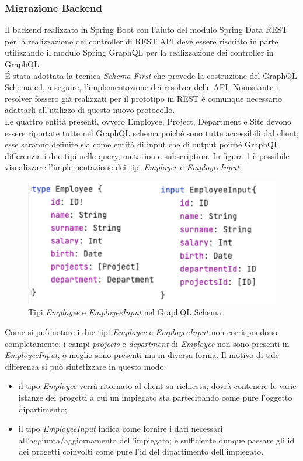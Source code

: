 \subsubsection*{Migrazione Backend}
Il backend realizzato in Spring Boot con l'aiuto del modulo Spring Data REST per la realizzazione dei controller di REST API deve essere riscritto in parte utilizzando il modulo Spring GraphQL per la realizzazione dei controller in GraphQL.\\
É stata adottata la tecnica \textit{Schema First} che prevede la costruzione del GraphQL Schema ed, a seguire, l'implementazione dei resolver delle API. Nonostante i resolver fossero già realizzati per il prototipo in REST è comunque necessario adattarli all'utilizzo di questo nuovo protocollo.\\
Le quattro entità presenti, ovvero Employee, Project, Department e Site devono essere riportate tutte nel GraphQL schema poiché sono tutte accessibili dal client; esse saranno definite sia come entità di input che di output poiché GraphQL differenzia i due tipi nelle query, mutation e subscription. In figura \ref{employee-schema} è possibile visualizzare l'implementazione dei tipi \textit{Employee} e \textit{EmployeeInput}.
\FloatBarrier
\begin{figure}[!ht]
\centering
\includegraphics[width=0.8\linewidth]{immagini/employeeSchema.pdf}
\caption{Tipi \textit{Employee} e \textit{EmployeeInput} nel GraphQL Schema.}
\label{employee-schema}
\end{figure}
\FloatBarrier
Come si può notare i due tipi \textit{Employee} e \textit{EmployeeInput} non corrispondono completamente: i campi \textit{projects} e \textit{department} di \textit{Employee} non sono presenti in \textit{EmployeeInput}, o  meglio sono presenti ma in diversa forma. Il motivo di tale differenza si può sintetizzare in questo modo:
\begin{itemize}
  \item il tipo \textit{Employee} verrà ritornato al client su richiesta; dovrà contenere le varie istanze dei progetti a cui un impiegato sta partecipando come pure l'oggetto dipartimento;
  \item il tipo \textit{EmployeeInput} indica come fornire i dati necessari all'aggiunta/aggiornamento dell'impiegato; è sufficiente dunque passare gli id dei progetti coinvolti come pure l'id del dipartimento dell'impiegato.
\end{itemize}
